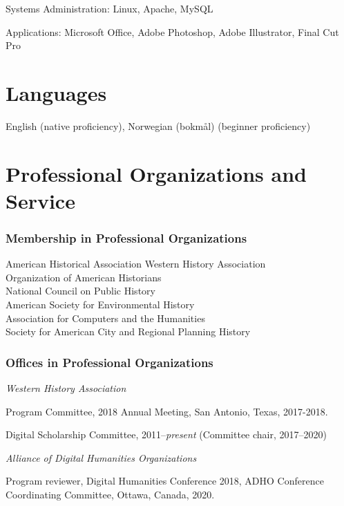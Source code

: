 Systems Administration: Linux, Apache, MySQL

Applications: Microsoft Office, Adobe Photoshop, Adobe Illustrator,
Final Cut Pro

\section{Languages}\label{languages}

English (native proficiency), Norwegian (bokm\r{a}l) (beginner
proficiency)

\section{Professional Organizations and
Service}\label{professional-organizations-and-service}

\subsubsection{Membership in Professional
Organizations}\label{membership-in-professional-organizations}

American Historical Association Western History Association\\
Organization of American Historians\\
National Council on Public History\\
American Society for Environmental History\\
Association for Computers and the Humanities\\
Society for American City and Regional Planning History

\subsubsection{Offices in Professional
Organizations}\label{offices-in-professional-organizations}

\emph{Western History Association}

Program Committee, 2018 Annual Meeting, San Antonio, Texas, 2017-2018.

Digital Scholarship Committee, 2011--\emph{present} (Committee chair,
2017--2020)

\vspace{.4cm}

\emph{Alliance of Digital Humanities Organizations}

Program reviewer, Digital Humanities Conference 2018, ADHO Conference
Coordinating Committee, Ottawa, Canada, 2020.


